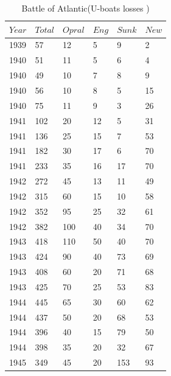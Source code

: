 \documentclass[]{article}
\begin{document}
\begin{table}
 

\tiny
\caption{Battle of Atlantic(U-boats losses \cite{hughes1977battle})\\}
\vspace{0.5cm}
\tiny

{\begin{tabular}{|p{.5cm}|p{.5cm}|p{.5cm}|p{.5cm}|p{.5cm}|p{.5cm}|} 
\hline
\centering

$Year$ & $Total$ & $Opral$	& $Eng$	& $Sunk$ & $New$ \\
\hline  
1939&	57&	12&	5&	9&	2\\
1940&	51&	11&	5&	6&	4\\
1940&	49&	10&	7&	8&	9\\
1940&	56&	10&	8&	5&	15\\
1940&	75&	11&	9&	3&	26\\
1941&	102&	20&	12&	5&	31\\
1941&	136&	25&	15&	7&	53\\
1941&	182&	30&	17&	6&	70\\
1941&	233&	35&	16&	17&	70\\
1942&	272&	45&	13&	11&	49\\
1942&	315&	60&	15&	10&	58\\
1942&	352&	95&	25&	32&	61\\
1942&	382&	100&	40&	34&	70\\
1943&	418&	110&	50&	40&	70\\
1943&	424&	90&	40&	73&	69\\
1943&	408&	60&	20&	71&	68\\
1943&	425&	70&	25&	53&	83\\
1944&	445&	65&	30&	60&	62\\
1944&	437&	50&	20&	68&	53\\
1944&	396&	40&	15&	79&	50\\
1944&	398&	35&	20&	32&	67\\
1945&	349&	45&	20&	153&	93\\

\hline

\end{tabular}}%
\tiny
\end{table}
\end{document}
